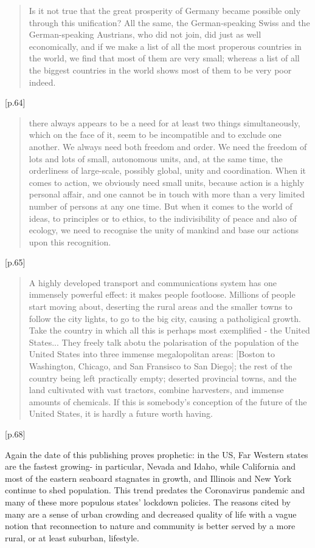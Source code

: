 \documentclass[letterpaper]{article}
\begin{document}
\begin{quote}
Is it not true that the great prosperity of Germany became possible only through this unification? All the same, the German-speaking Swiss and the German-speaking Austrians, who did not join, did just as well economically, and if we make a list of all the most properous countries in the world, we find that most of them are very small; whereas a list of all the biggest countries in the world shows most of them to be very poor indeed.
\end{quote} [p.64]

\begin{quote}
there always appears to be a need for at least two things simultaneously, which on the face of it, seem to be incompatible and to exclude one another. We always need both freedom and order. We need the freedom of lots and lots of small, autonomous units, and, at the same time, the orderliness of large-scale, possibly global, unity and coordination. When it comes to action, we obviously need small units, because action is a highly personal affair, and one cannot be in touch with more than a very limited number of persons at any one time. But when it comes to the world of ideas, to principles or to ethics, to the indivisibility of peace and also of ecology, we need to recognise the unity of mankind and base our actions upon this recognition.
\end{quote} [p.65]

\begin{quote}
A highly developed transport and communications system has one immensely powerful effect: it makes people footloose. Millions of people start moving about, deserting the rural areas and the smaller towns to follow the city lights, to go to the big city, causing a patholigical growth. Take the country in which all this is perhaps most exemplified - the United States... They freely talk abotu the polarisation of the population of the United States into three immense megalopolitan areas: [Boston to Washington, Chicago, and San Fransisco to San Diego]; the rest of the country being left practically empty; deserted provincial towns, and the land cultivated with vast tractors, combine harvesters, and immense amounts of chemicals. If this is somebody's conception of the future of the United States, it is hardly a future worth having.
\end{quote}[p.68]

Again the date of this publishing proves prophetic: in the US, Far Western states are the fastest growing- in particular, Nevada and Idaho, while California and most of the eastern seaboard stagnates in growth, and Illinois and New York continue to shed population. This trend predates the Coronavirus pandemic and many of these more populous states' lockdown policies. The reasons cited by many are a sense of urban crowding and decreased quality of life with a vague notion that reconnection to nature and community is better served by a more rural, or at least suburban, lifestyle.
\end{document}
